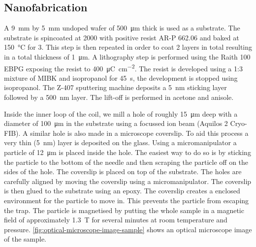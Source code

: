 \subsection{Nanofabrication}
\label{subsec:nanofabrication}
A \qty{9}{\mm} by \qty{5}{\mm} undoped  wafer of \qty{500}{\um} thick is used as a substrate. The substrate is spincoated at \qty{2000}{\rpm} with positive resist AR-P 662.06 and baked at \qty{150}{\celsius} for \qty{3}{\min}. This step is then repeated in order to coat 2 layers in total resulting in a total thickness of \qty{1}{\um}. A lithography step is performed using the Raith 100 EBPG exposing the resist to \qty{400}{\micro\coulomb\per\square\cm}. The resist is developed using a 1:3 mixture of MIBK and isopropanol for \qty{45}{\s}, the development is stopped using isopropanol. The Z-407 sputtering machine deposits a \qty{5}{\nm}  sticking layer followed by a \qty{500}{\nm}  layer. The lift-off is performed in acetone and anisole.

Inside the inner loop of the coil, we mill a hole of roughly \qty{15}{\um} deep with a diameter of \qty{100}{\um} in the  substrate using a  focussed ion beam (Aquilos 2 Cryo-FIB). A similar hole is also made in a microscope coverslip. To aid this process a very thin (\qty{5}{\nano\meter})  layer is deposited on the glass. Using a micromanipulator a  particle of \qty{12}{\um} is placed inside the  hole. The easiest way to do so is by sticking the particle to the bottom of the needle and then scraping the particle off on the sides of the  hole. The coverslip is placed on top of the  substrate. The holes are carefully aligned by moving the coverslip using a micromanipulator. The coverslip is then glued to the  substrate using an epoxy. The coverslip creates a enclosed environment for the particle to move in. This prevents the particle from escaping the trap. The particle is magnetised by putting the whole sample in a magnetic field of approximately \qty{1.3}{\tesla} for several minutes at room temperature and pressure. \autoref{fig:optical-microscope-image-sample} shows an optical microscope image of the sample.

